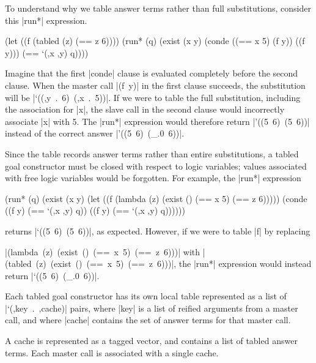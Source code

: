 To understand why we table answer terms rather than full
substitutions, consider this \scheme|run*| expression.

\schemedisplayspace
\begin{schemedisplay}
(let ((f (tabled (z) (== z 6))))
  (run* (q)
    (exist (x y)
      (conde
        ((== x 5) (f y))
        ((f y)))
      (== `(,x ,y) q))))
\end{schemedisplay}

\noindent 
Imagine that the first \scheme|conde| clause is evaluated completely
before the second clause.  When the master call \mbox{\scheme|(f y)|} 
in the first clause succeeds, the substitution will be \mbox{\scheme|`((,y . 6) (,x . 5))|}.
If we were to table the full substitution, including the association for \scheme|x|, 
the slave call in the second clause would incorrectly associate \scheme|x| with 5.
The \scheme|run*| expression would therefore return
\mbox{\scheme|'((5 6) (5 6))|} instead of the correct answer
\mbox{\scheme|'((5 6) (_.0 6))|}.

Since the table records answer terms rather than entire substitutions,
a tabled goal constructor must be closed with respect to logic
variables; values associated with free logic variables would be
forgotten.  For example, the \scheme|run*| expression

\schemedisplayspace
\begin{schemedisplay}
(run* (q)
  (exist (x y)
    (let ((f (lambda (z) (exist () (== x 5) (== z 6)))))
      (conde
        ((f y) (== `(,x ,y) q))
        ((f y) (== `(,x ,y) q))))))
\end{schemedisplay}

\noindent returns \mbox{\scheme|`((5 6) (5 6))|}, as expected.  However, 
if we were to table \scheme|f| by replacing 

\noindent \mbox{\scheme|(lambda (z) (exist () (== x 5) (== z 6)))|} with 
\mbox{\scheme|(tabled (z) (exist () (== x 5) (== z 6)))|}, 
the \scheme|run*| expression would instead return \mbox{\scheme|`((5 6) (_.0 6))|}.

Each tabled goal constructor has its own local table represented as a
list of \mbox{\scheme|`(,key . ,cache)|} pairs, where \scheme|key| is
a list of reified arguments from a master call, and where
\scheme|cache| contains the set of answer terms for that master call.

A cache is represented as a tagged vector, and contains a list
of tabled answer terms.  Each master call is associated with a single
cache.

